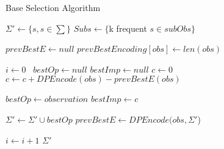 \begin{algorithm}
\caption{Base Selection Algorithm}
\label{Base Selection}
\begin{algorithmic}[1]
\State $\Sigma' \gets \{s, s \in \sum \}$
\State $Subs \gets \{$k frequent $s \in subObs\}$

\State $prevBestE \gets null$
	\State $prevBestEncoding[obs] \gets len(obs)$
\EndFor

\State $i\gets 0$\
	\State $bestOp \gets null$
	\State $bestImp \gets null$
		\State $c \gets 0$
			\State $c \gets c+DPEncode(obs)-prevBestE(obs)$
		\EndFor
		
			\State $bestOp \gets observation$
			\State $bestImp \gets c$
		\EndIf
		
	\EndFor

	\State $\Sigma' \gets \Sigma' \cup bestOp$
		\State $prevBestE \gets DPEncode(obs,\Sigma'$) 
	\EndFor	
	
	\State $i \gets i + 1$
\EndWhile 
\Return $\Sigma'$

\EndProcedure
\end{algorithmic}
\end{algorithm}

